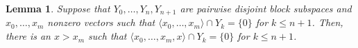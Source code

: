 \documentclass[11pt]{amsart}
\newtheorem{lemma}[thm]{Lemma}
\theoremstyle{definition}
\theoremstyle{remark}
\renewcommand{\1}{\mathbf{1}}
\begin{document}
%
%	

\begin{lemma}\label{lem:disj_subs2}
	Suppose that $Y_0,\ldots, Y_n,Y_{n+1}$ are pairwise disjoint block subspaces and $x_0,\ldots,x_m$ nonzero vectors such that $\langle x_0,\ldots,x_m\rangle\cap Y_k=\{0\}$ for $k\leq n+1$. Then, there is an $x>x_m$ such that $\langle x_0,\ldots,x_m,x\rangle\cap Y_k=\{0\}$ for $k\leq n+1$.	
\end{lemma}
\end{document}
